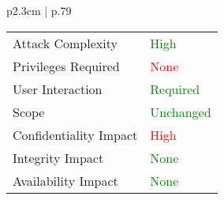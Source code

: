 \begin{longtable}{ p{2.3cm} | p{.79\linewidth} }
\begin{tabular}[t]{@{}l | l}
            Attack Complexity       & \textcolor{Green}{High} \\
            Privileges Required     & \textcolor{red}{None} \\
            User Interaction        & \textcolor{Green}{Required} \\
            Scope                   & \textcolor{Green}{Unchanged} \\
            Confidentiality Impact  & \textcolor{red}{High} \\
            Integrity Impact        & \textcolor{Green}{None} \\
            Availability Impact     & \textcolor{Green}{None}
        \end{tabular} \\
   	\hline
\end{longtable}

